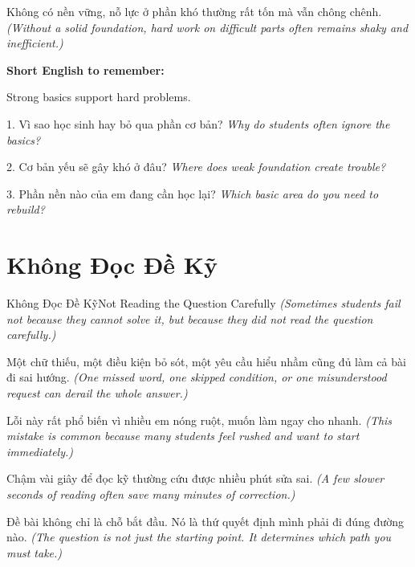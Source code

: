 \begin{baihoc}
Không có nền vững, nỗ lực ở phần khó thường rất tốn mà vẫn chông chênh.
\textit{(Without a solid foundation, hard work on difficult parts often remains shaky and inefficient.)}
\end{baihoc}

\begin{ghinhoanh}
\textbf{Short English to remember:}

Strong basics support hard problems.

\end{ghinhoanh}

\begin{tuhocnhanh}
1. Vì sao học sinh hay bỏ qua phần cơ bản? \textit{Why do students often ignore the basics?}

2. Cơ bản yếu sẽ gây khó ở đâu? \textit{Where does weak foundation create trouble?}

3. Phần nền nào của em đang cần học lại? \textit{Which basic area do you need to rebuild?}
\end{tuhocnhanh}
\ngancach

\section{Không Đọc Đề Kỹ}
\begin{truyen}{Không Đọc Đề Kỹ}{Not Reading the Question Carefully}
\textit{(Sometimes students fail not because they cannot solve it, but because they did not read the question carefully.)}

Một chữ thiếu, một điều kiện bỏ sót, một yêu cầu hiểu nhầm cũng đủ làm cả bài đi sai hướng.
\textit{(One missed word, one skipped condition, or one misunderstood request can derail the whole answer.)}

Lỗi này rất phổ biến vì nhiều em nóng ruột, muốn làm ngay cho nhanh.
\textit{(This mistake is common because many students feel rushed and want to start immediately.)}

Chậm vài giây để đọc kỹ thường cứu được nhiều phút sửa sai.
\textit{(A few slower seconds of reading often save many minutes of correction.)}
\end{truyen}

\begin{baihoc}
Đề bài không chỉ là chỗ bắt đầu. Nó là thứ quyết định mình phải đi đúng đường nào.
\textit{(The question is not just the starting point. It determines which path you must take.)}
\end{baihoc}

